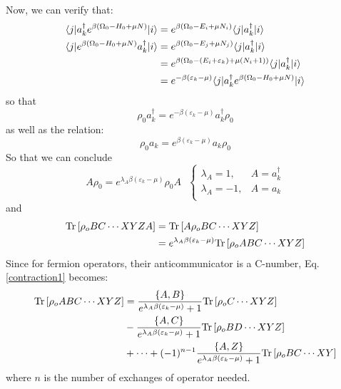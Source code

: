 \documentclass{article}
\begin{document}
Now, we can verify that:
\begin{align}
    \langle j | a_k^{\dagger} e^{\beta(\Omega_0 - H_0 + \mu N)} | i \rangle 
            &= e^{\beta(\Omega_0 - E_i + \mu N_i)} \langle j |a_k^{\dagger} | i \rangle  \notag \\
    \langle j | e^{\beta(\Omega_0 - H_0 + \mu N)} a_k^{\dagger}  | i \rangle 
            &= e^{\beta(\Omega_0 - E_j + \mu N_j)} \langle j |a_k^{\dagger} | i \rangle  \notag \\
            &= e^{\beta(\Omega_0 - (E_i+\varepsilon_k) + \mu (N_i+1))} \langle j |a_k^{\dagger} | i \rangle  \notag \\
            &= e^{-\beta (\varepsilon_k - \mu)} \langle j | a_k^{\dagger} e^{\beta(\Omega_0 - H_0 + \mu N)} | i \rangle \label{rhoA}
\end{align}
so that 
\begin{equation}
    \rho_0 a_k^{\dagger} = e^{-\beta (\varepsilon_k - \mu)} a_k^{\dagger} \rho_0
\end{equation}
as well as the relation:
\begin{equation}
    \rho_0 a_k = e^{\beta (\varepsilon_k - \mu)} a_k \rho_0
\end{equation}
So that we can conclude
\begin{equation}
    A\rho_0 = e^{\lambda_A \beta (\varepsilon_k - \mu)} \rho_0 A\ \ \
    \begin{cases}
        \lambda_A = 1 , & A = a_k^{\dagger} \\
        \lambda_A = -1 , & A = a_k \\
    \end{cases}
\end{equation}
and 
\begin{align}
    \text{Tr}\left[ \rho_o BC \cdots XYZA  \right] &= \text{Tr}\left[ A \rho_o BC \cdots XYZ  \right] \notag \\
                            &= e^{\lambda_A \beta (\varepsilon_k - \mu)} \text{Tr}\left[ \rho_o ABC \cdots XYZ  \right] \notag \\
\end{align}
Since for fermion operators, their anticommunicator is a C-number, 
Eq.\ref{contraction1} becomes:
\begin{align}
    \text{Tr}\left[ \rho_o ABC \cdots XYZ  \right] &= \frac{\{A,B\}}{e^{\lambda_A \beta (\varepsilon_k - \mu)} + 1} \text{Tr}\left[ \rho_o C \cdots XYZ  \right] \notag \\
                                                & - \frac{\{A,C\}}{e^{\lambda_A \beta (\varepsilon_k - \mu)} + 1} \text{Tr}\left[ \rho_o BD \cdots XYZ  \right] \notag \\
                                                & + \cdots +  (-1)^{n-1} \frac{\{A,Z\}}{e^{\lambda_A \beta (\varepsilon_k - \mu)} + 1} \text{Tr}\left[ \rho_o BC \cdots XY  \right] \label{contraction2}
\end{align}
where $n$ is the number of exchanges of operator needed. 
\end{document}
